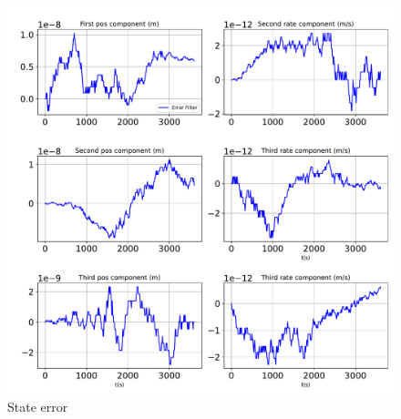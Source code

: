 \begin{figure}[htbp]\centerline{\includegraphics[height=0.9\textwidth, keepaspectratio]{AutoTeX/StatesPlotProp}}\caption{State error}\label{fig:StatesPlotProp}\end{figure}